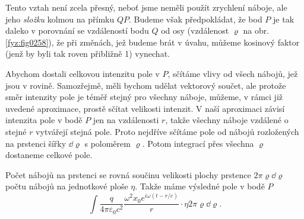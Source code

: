     Tento vztah není zcela přesný, neboť jsme neměli použít zrychlení náboje, ale jeho 
    \emph{složku} kolmou na přímku \(QP\). Budeme však předpokládat, že bod \(P\) je tak daleko v 
    porovnání se vzdáleností bodu \(Q\) od osy (vzdálenost \(\varrho\) na obr. \ref{fyz:fig0258}), 
    že při změnách, jež budeme brát v úvahu, můžeme kosinový faktor (jenž by byli tak roven 
    přibližně \num{1}) vynechat.
    
    Abychom dostali celkovou intenzitu pole v \(P\), sčítáme vlivy od všech nábojů, jež jsou v 
    rovině. Samozřejmě, měli bychom udělat vektorový součet, ale protože směr intenzity pole je 
    téměř stejný pro všechny náboje, můžeme, v rámci již uvedené aproximace, prostě sčítat 
    velikosti intenzit. V naší aproximaci závisí intenzita pole v bodě \(P\) jen na vzdálenosti 
    \(r\), takže všechny náboje vzdálené o stejné \(r\) vytvářejí stejná pole. Proto nejdříve 
    sčítáme pole od nábojů rozložených na prstenci šířky \(\dd{\varrho}\) s poloměrem \(\varrho\). 
    Potom integrací přes všechna \(\varrho\) dostaneme celkové pole.
    
    Počet nábojů na prstenci se rovná součinu velikosti plochy prstence \(2\pi\varrho\dd{\varrho}\) 
    počtu nábojů na jednotkové ploše \(\eta\). Takže máme výsledné pole v bodě \(P\)
    \begin{equation}\label{fyz:eq333}
      \int\frac{q}{4\pi\varepsilon_0c^2}
      \frac{\omega^2x_0e^{i\omega(t-r/c)}}{r}
      \cdot\eta2\pi\varrho\dd{\varrho}.
    \end{equation}
    
